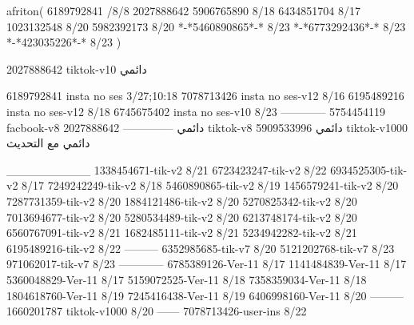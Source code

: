 afriton(
6189792841 /8/8
2027888642
5906765890 8/18
6434851704 8/17
1023132548 8/20
5982392173 8/20
*-*5460890865*-* 8/23
*-*6773292436*-* 8/23
*-*423035226*-* 8/23
)

2027888642 tiktok-v10
دائمي

6189792841 insta no ses
3/27;10:18
7078713426 insta no ses-v12
8/16
6195489216 insta no ses-v12
8/18
6745675402 insta no ses-v10
8/23
------------
5754454119 facbook-v8
دائمي
--------------
2027888642 tiktok-v8
دائمي
5909533996 tiktok-v1000
دائمي مع التحديث

__________
1338454671-tik-v2
8/21
6723423247-tik-v2
8/22
6934525305-tik-v2
8/17
7249242249-tik-v2
8/18
5460890865-tik-v2
8/19
1456579241-tik-v2
8/20
7287731359-tik-v2
8/20
1884121486-tik-v2
8/20
5270825342-tik-v2
8/20
7013694677-tik-v2
8/20
5280534489-tik-v2
8/20
6213748174-tik-v2
8/20
6560767091-tik-v2
8/21
1682485111-tik-v2
8/21
5234942282-tik-v2
8/21
6195489216-tik-v2
8/22
---------
6352985685-tik-v7
8/20
5121202768-tik-v7
8/23
971062017-tik-v7
8/23
------------
6785389126-Ver-11
8/17
1141484839-Ver-11
8/17
5360048829-Ver-11
8/17
5159072525-Ver-11
8/18
7358359034-Ver-11
8/18
1804618760-Ver-11
8/19
7245416438-Ver-11
8/19
6406998160-Ver-11
8/20
---------
1660201787 tiktok-v1000
8/20
------
7078713426-user-ins
8/22
